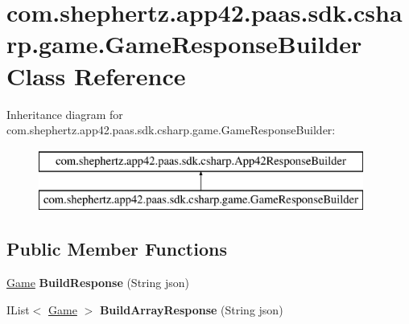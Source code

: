 \hypertarget{classcom_1_1shephertz_1_1app42_1_1paas_1_1sdk_1_1csharp_1_1game_1_1_game_response_builder}{\section{com.\+shephertz.\+app42.\+paas.\+sdk.\+csharp.\+game.\+Game\+Response\+Builder Class Reference}
\label{classcom_1_1shephertz_1_1app42_1_1paas_1_1sdk_1_1csharp_1_1game_1_1_game_response_builder}
}
Inheritance diagram for com.\+shephertz.\+app42.\+paas.\+sdk.\+csharp.\+game.\+Game\+Response\+Builder\+:\begin{figure}[H]
\begin{center}
\leavevmode
\includegraphics[height=2.000000cm]{classcom_1_1shephertz_1_1app42_1_1paas_1_1sdk_1_1csharp_1_1game_1_1_game_response_builder}
\end{center}
\end{figure}
\subsection*{Public Member Functions}
\begin{DoxyCompactItemize}
\item 
\hypertarget{classcom_1_1shephertz_1_1app42_1_1paas_1_1sdk_1_1csharp_1_1game_1_1_game_response_builder_a97afa937aae066d538a81c983183ca9f}{\hyperlink{classcom_1_1shephertz_1_1app42_1_1paas_1_1sdk_1_1csharp_1_1game_1_1_game}{Game} {\bfseries Build\+Response} (String json)}\label{classcom_1_1shephertz_1_1app42_1_1paas_1_1sdk_1_1csharp_1_1game_1_1_game_response_builder_a97afa937aae066d538a81c983183ca9f}

\item 
\hypertarget{classcom_1_1shephertz_1_1app42_1_1paas_1_1sdk_1_1csharp_1_1game_1_1_game_response_builder_a05dbb3a1b14a5a13ae53fe731ecd0182}{I\+List$<$ \hyperlink{classcom_1_1shephertz_1_1app42_1_1paas_1_1sdk_1_1csharp_1_1game_1_1_game}{Game} $>$ {\bfseries Build\+Array\+Response} (String json)}\label{classcom_1_1shephertz_1_1app42_1_1paas_1_1sdk_1_1csharp_1_1game_1_1_game_response_builder_a05dbb3a1b14a5a13ae53fe731ecd0182}

\end{DoxyCompactItemize}
